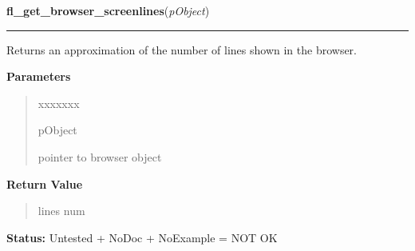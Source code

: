 \hspace{.8\funcindent}\begin{boxedminipage}{\funcwidth}

    \raggedright \textbf{fl\_get\_browser\_screenlines}(\textit{pObject})

    \vspace{-1.5ex}

    \rule{\textwidth}{0.5\fboxrule}
\setlength{\parskip}{2ex}
    Returns an approximation of the number of lines shown in the browser.

\setlength{\parskip}{1ex}
      \textbf{Parameters}
      \vspace{-1ex}

      \begin{quote}
        \begin{Ventry}{xxxxxxx}

          \item[pObject]

          pointer to browser object

        \end{Ventry}

      \end{quote}

      \textbf{Return Value}
    \vspace{-1ex}

      \begin{quote}
      lines num

      \end{quote}

\textbf{Status:} Untested + NoDoc + NoExample = NOT OK



    \end{boxedminipage}

    \label{xformslib:library:fl_set_browser_topline}

    \vspace{0.5ex}

